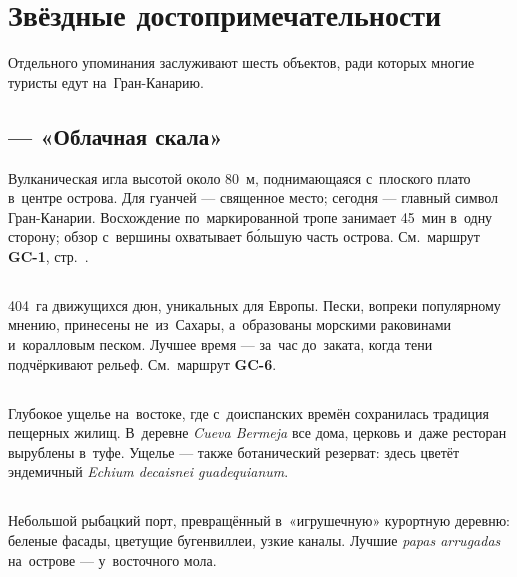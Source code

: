 \chapter{Звёздные достопримечательности}

Отдельного упоминания заслуживают шесть объектов, ради которых
многие туристы едут на~Гран-Канарию.

\section{ --- «Облачная скала»}


Вулканическая игла высотой около 80~м, поднимающаяся с~плоского
плато в~центре острова. Для гуанчей --- священное место; сегодня ---
главный символ Гран-Канарии. Восхождение по~маркированной тропе
занимает 45~мин в~одну сторону; обзор с~вершины охватывает
бо́льшую часть острова. См.~маршрут \textbf{GC-1}, стр.~\pageref{hike:gc1}.

\section{}


404~га движущихся дюн, уникальных для Европы. Пески, вопреки
популярному мнению, принесены не~из~Сахары, а~образованы морскими
раковинами и~коралловым песком. Лучшее время --- за~час до~заката,
когда тени подчёркивают рельеф. См.~маршрут \textbf{GC-6}.

\section{}

Глубокое ущелье на~востоке, где с~доиспанских времён сохранилась
традиция пещерных жилищ. В~деревне \textit{Cueva Bermeja} все дома,
церковь и~даже ресторан вырублены в~туфе. Ущелье --- также ботанический
резерват: здесь цветёт эндемичный \textit{Echium decaisnei guadequianum}.

\section{}

Небольшой рыбацкий порт, превращённый в~«игрушечную» курортную
деревню: беленые фасады, цветущие бугенвиллеи, узкие каналы.
Лучшие \textit{papas arrugadas} на~острове --- у~восточного мола.

